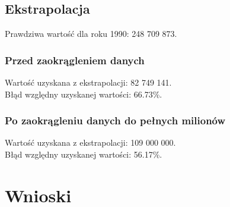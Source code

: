 \documentclass[11pt]{scrartcl}
\begin{document}
    \subsection{Ekstrapolacja}
    Prawdziwa wartość dla roku 1990: 248 709 873.

    \subsubsection*{Przed zaokrągleniem danych}
    Wartość uzyskana z ekstrapolacji: 82 749 141. \\
    Błąd względny uzyskanej wartości: 66.73\%.

    \subsubsection*{Po zaokrągleniu danych do pełnych milionów}
    Wartość uzyskana z ekstrapolacji: 109 000 000. \\
    Błąd względny uzyskanej wartości: 56.17\%.

    \section{Wnioski}
\end{document}
